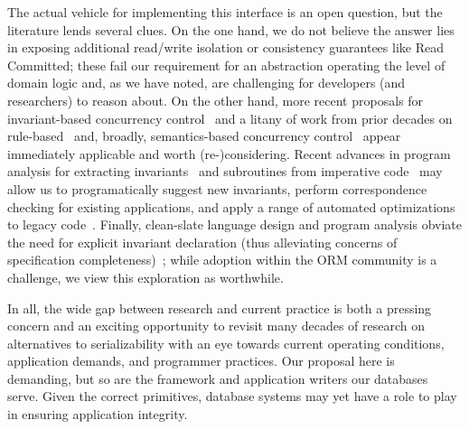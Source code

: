  The actual vehicle for
implementing this interface is an open question, but the literature
lends several clues. On the one hand, we do not believe the answer
lies in exposing additional read/write isolation or consistency
guarantees like Read Committed; these fail our requirement for an
abstraction operating the level of domain logic and, as we have noted,
are challenging for developers (and researchers) to reason about. On
the other hand, more recent proposals for invariant-based concurrency
control~\cite{redblue-new,coord-avoid} and a litany of work from prior
decades on rule-based~\cite{activedb-book} and, broadly,
semantics-based concurrency control~\cite{tamer-book} appear
immediately applicable and worth (re-)considering. Recent advances in
program analysis for extracting invariants~\cite{writes-forest} and
subroutines from imperative code~\cite{statusquo} may allow us to
programatically suggest new invariants, perform correspondence
checking for existing applications, and apply a range of automated
optimizations to legacy code~\cite{pyxis,waves}. Finally, clean-slate
language design and program analysis obviate the need for explicit
invariant declaration (thus alleviating concerns of specification
completeness)~\cite{calm,blazes,hilda}; while adoption within the ORM
community is a challenge, we view this exploration as worthwhile.

 In all, the wide gap between research and current practice is both a
pressing concern and an exciting opportunity to revisit many decades
of research on alternatives to serializability with an eye towards
current operating conditions, application demands, and programmer
practices. Our proposal here is demanding, but so are the framework
and application writers our databases serve. Given the correct
primitives, database systems may yet have a role to play in ensuring
application integrity.

